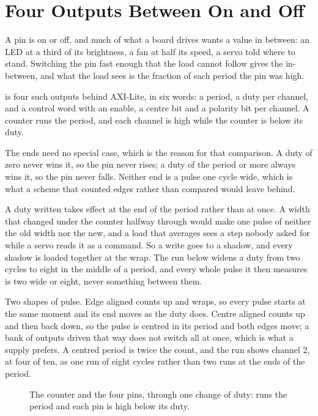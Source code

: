\section{Four Outputs Between On and Off}
\label{sec:x-pwm}

A pin is on or off, and much of what a board drives wants a value in
between: an LED at a third of its brightness, a fan at half its speed,
a servo told where to stand. Switching the pin fast enough that the
load cannot follow gives the in-between, and what the load sees is the
fraction of each period the pin was high.

 is four such outputs behind AXI-Lite, in six words: a
period, a duty per channel, and a control word with an enable, a
centre bit and a polarity bit per channel. A counter runs the period,
and each channel is high while the counter is below its duty.

The ends need no special case, which is the reason for that
comparison. A duty of zero never wins it, so the pin never rises; a
duty of the period or more always wins it, so the pin never falls.
Neither end is a pulse one cycle wide, which is what a scheme that
counted edges rather than compared would leave behind.

A duty written takes effect at the end of the period rather than at
once. A width that changed under the counter halfway through would
make one pulse of neither the old width nor the new, and a load that
averages sees a step nobody asked for while a servo reads it as a
command. So a write goes to a shadow, and every shadow is loaded
together at the wrap. The run below widens a duty from two cycles to
eight in the middle of a period, and every whole pulse it then
measures is two wide or eight, never something between them.

Two shapes of pulse. Edge aligned counts up and wraps, so every pulse
starts at the same moment and its end moves as the duty does. Centre
aligned counts up and then back down, so the pulse is centred in its
period and both edges move; a bank of outputs driven that way does not
switch all at once, which is what a supply prefers. A centred period
is twice the count, and the run shows channel 2, at four of ten, as
one run of eight cycles rather than two runs at the ends of the
period.

\begin{figure}[htbp]
\centering

\caption{The counter and the four pins, through one change of duty:
 runs the period and each pin is high below its duty.}
\label{fig:x-pwm}
\end{figure}




